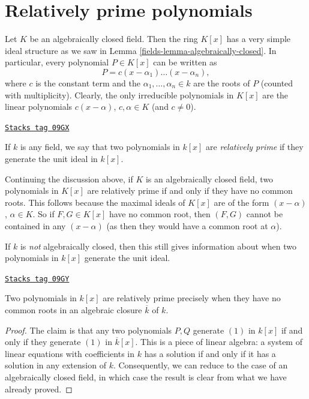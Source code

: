 \section{Relatively prime polynomials}
\label{fields-section-relatively-prime}
Let $K$ be an algebraically closed field. Then the ring $K[x]$ has a very
simple ideal structure as we saw in Lemma \ref{fields-lemma-algebraically-closed}.
In particular, every polynomial $P \in K[x]$ can be written as
$$
P = c(x - \alpha_1) \ldots (x - \alpha_n),
$$
where $c$ is the constant term and the $\alpha_1, \ldots, \alpha_n \in k$
are the roots of $P$ (counted with multiplicity). Clearly, the only irreducible
polynomials in $K[x]$ are the linear polynomials $c(x - \alpha)$,
$c, \alpha \in K$ (and $c \neq 0$).

\begin{definition}
\label{fields-definition-relatively-prime}
\href{https://stacks.math.columbia.edu/tag/09GX}{\texttt{Stacks tag 09GX}}

If $k$ is any field, we say that two polynomials in $k[x]$ are
{\it relatively prime} if they generate the unit ideal in $k[x]$.
\end{definition}

Continuing the discussion above, if $K$ is an algebraically closed field,
two polynomials in $K[x]$ are relatively prime if and only if they have no
common roots. This follows because the maximal ideals of $K[x]$ are of the form
$(x - \alpha)$, $\alpha \in K$. So if $F, G \in K[x]$ have no common root,
then $(F, G)$ cannot be contained in any $(x - \alpha)$ (as then they would
have a common root at $\alpha$).

\medskip\noindent
If $k$ is {\it not} algebraically closed, then this still gives
information about when two polynomials in $k[x]$ generate the unit ideal.

\begin{lemma}
\label{fields-lemma-relatively-prime-polynomials}
\href{https://stacks.math.columbia.edu/tag/09GY}{\texttt{Stacks tag 09GY}}

Two polynomials in $k[x]$ are relatively prime precisely when they
have no common roots in an algebraic closure $\overline{k}$ of $k$.
\end{lemma}

\begin{proof}
The claim is that any two polynomials $P, Q$ generate $(1)$ in $k[x]$ if and
only if they generate $(1)$ in $\overline{k}[x]$. This is a piece of
linear algebra: a system of linear equations with coefficients in $k$ has
a solution if and only if it has a solution in any extension of $k$.
Consequently, we can reduce to the case of an algebraically closed field, in
which case the result is clear from what we have already proved.
\end{proof}

